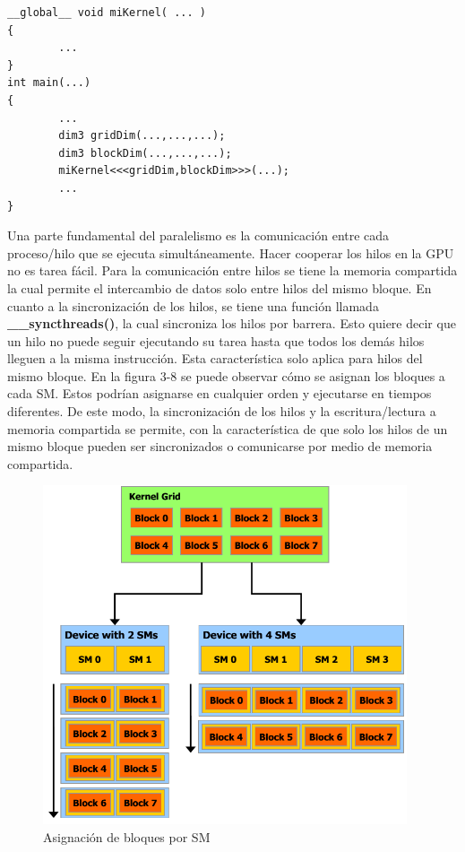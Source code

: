 \begin{lstlisting}[caption=Lanzamiento de un Kernel en CUDA C.]
__global__ void miKernel( ... )
{
        ...
}
int main(...)
{
        ...     
        dim3 gridDim(...,...,...);
        dim3 blockDim(...,...,...);
        miKernel<<<gridDim,blockDim>>>(...);    
        ...
}
\end{lstlisting}
Una parte fundamental del paralelismo es la comunicación entre cada proceso/hilo que se ejecuta simultáneamente. Hacer cooperar los hilos en la GPU no es tarea fácil. Para la comunicación entre hilos se tiene la memoria compartida la cual permite el intercambio de datos solo entre hilos del mismo bloque. En cuanto a la sincronización de los hilos, se tiene una función llamada \textbf{\_\_syncthreads()}, la cual sincroniza los hilos por barrera. Esto quiere decir que un hilo no puede seguir ejecutando su tarea hasta que todos los demás hilos lleguen a la misma instrucción. Esta característica solo aplica para  hilos del mismo bloque. En la figura 3-8 se puede observar cómo se asignan los bloques a cada SM. Estos podrían asignarse en cualquier orden y ejecutarse en tiempos diferentes. De este modo, la sincronización de los hilos y la escritura/lectura a memoria compartida se permite, con la característica de que solo los hilos de un mismo bloque pueden ser sincronizados o comunicarse por medio de memoria compartida.
\begin{figure}[H]
                      \centering
                              \includegraphics[height=10cm]{img/block_sm.png}
                      \caption{Asignación de bloques por SM \cite{Flops}}
\end{figure}
